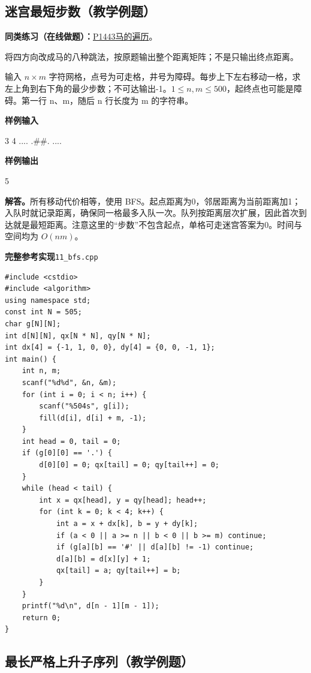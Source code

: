 \documentclass[UTF8,11pt,a4paper,fontset=none]{ctexart}
\newcommand{\practice}[2]{\par\noindent\textbf{同类练习（在线做题）：}\href{https://www.luogu.com.cn/problem/#1}{#1\quad #2}。\par}
\begin{document}
\subsection{迷宫最短步数（教学例题）}

\practice{P1443}{马的遍历}
将四方向改成马的八种跳法，按原题输出整个距离矩阵；不是只输出终点距离。

输入 $n\times m$ 字符网格，点号为可走格，井号为障碍。每步上下左右移动一格，求左上角到右下角的最少步数；不可达输出-1。$1\le n,m\le500$，起终点也可能是障碍。第一行 n、m，随后 n 行长度为 m 的字符串。
\begin{tcolorbox}[samplebox,title={输入输出样例}]
\textbf{样例输入}
\begin{Sample}
3 4
....
.##.
....
\end{Sample}
\tcblower
\textbf{样例输出}
\begin{Sample}
5
\end{Sample}
\end{tcolorbox}

\noindent\textbf{解答。}所有移动代价相等，使用 BFS。起点距离为0，邻居距离为当前距离加1；入队时就记录距离，确保同一格最多入队一次。队列按距离层次扩展，因此首次到达就是最短距离。注意这里的“步数”不包含起点，单格可走迷宫答案为0。时间与空间均为 $O(nm)$。
\par\noindent\begin{minipage}{\linewidth}
\textbf{完整参考实现}\quad\texttt{11\_bfs.cpp}
\begin{lstlisting}
#include <cstdio>
#include <algorithm>
using namespace std;
const int N = 505;
char g[N][N];
int d[N][N], qx[N * N], qy[N * N];
int dx[4] = {-1, 1, 0, 0}, dy[4] = {0, 0, -1, 1};
int main() {
    int n, m;
    scanf("%d%d", &n, &m);
    for (int i = 0; i < n; i++) {
        scanf("%504s", g[i]);
        fill(d[i], d[i] + m, -1);
    }
    int head = 0, tail = 0;
    if (g[0][0] == '.') {
        d[0][0] = 0; qx[tail] = 0; qy[tail++] = 0;
    }
    while (head < tail) {
        int x = qx[head], y = qy[head]; head++;
        for (int k = 0; k < 4; k++) {
            int a = x + dx[k], b = y + dy[k];
            if (a < 0 || a >= n || b < 0 || b >= m) continue;
            if (g[a][b] == '#' || d[a][b] != -1) continue;
            d[a][b] = d[x][y] + 1;
            qx[tail] = a; qy[tail++] = b;
        }
    }
    printf("%d\n", d[n - 1][m - 1]);
    return 0;
}
\end{lstlisting}
\end{minipage}\par

\subsection{最长严格上升子序列（教学例题）}
\end{document}
